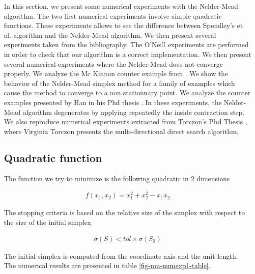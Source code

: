 In this section, we present some numerical experiments 
with the Nelder-Mead algorithm.
The two first numerical experiments involve simple quadratic functions.
These experiments allows to see the difference between
Spendley's et al. algorithm and the Nelder-Mead algorithm.
We then present several experiments taken from the bibliography.
The O'Neill experiments \cite{O'Neill1971AAF} are performed in order 
to check that our algorithm is a correct implementation.
We then present several numerical experiments where the Nelder-Mead
does not converge properly.
We analyze the Mc Kinnon counter example 
from \cite{589109}. We show the behavior of the 
Nelder-Mead simplex method for a family of examples which cause the 
method to converge to a non stationnary point.
We analyze the counter examples presented by Han in his Phd thesis \cite{Han2000}.
In these experiments, the Nelder-Mead algorithm degenerates by applying repeatedly
the inside contraction step.
We also reproduce numerical experiments extracted from Torczon's Phd Thesis 
\cite{Torczon89multi-directionalsearch}, where Virginia Torczon 
presents the multi-directional direct search algorithm. 

\subsection{Quadratic function}

The function we try to minimize is the following quadratic 
in 2 dimensions 

\begin{eqnarray}
f(x_1,x_2) = x_1^2 + x_2^2 - x_1 x_2
\end{eqnarray}

The stopping criteria is based on the relative size of the simplex 
with respect to the size of the initial simplex 

\begin{eqnarray}
\sigma(S) < tol \times \sigma(S_0)
\end{eqnarray}

The initial simplex is computed from the coordinate axis and the unit length.
The numerical results are presented in table \ref{fig-nm-numexp1-table}.

